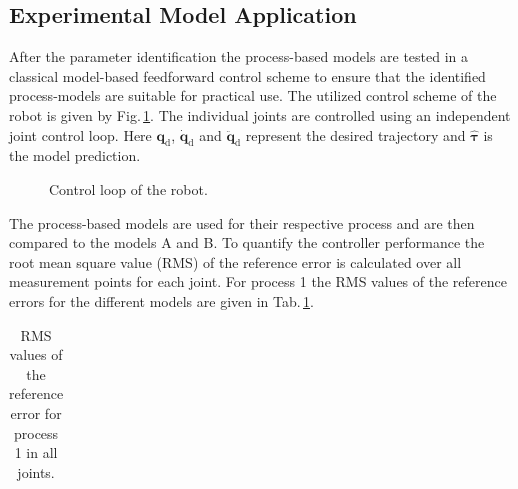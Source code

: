 
\subsection{Experimental Model Application}


After the parameter identification the process-based models are tested in a classical model-based feedforward control scheme to ensure that the identified process-models are suitable for practical use. The utilized control scheme of the robot is given by Fig.\,\ref{fig:controler}. The individual joints are controlled using an independent joint control loop. 
Here $\boldsymbol{q}_\text{d}$, $\dot{\boldsymbol{q}}_\text{d}$ and $\ddot{\boldsymbol{q}}_\text{d}$ represent the desired trajectory and $\hat{\boldsymbol{\tau}}$ is the model prediction.


\begin{figure}[tb]
  \vspace{-0.2cm}
  \centering
   
  \caption{Control loop of the robot.}
  \label{fig:controler}
  \vspace{-0.1cm}
\end{figure}


The process-based models are used for their respective process and are then compared to the models A and B. %
To quantify the controller performance the root mean square value (RMS) of the reference error is calculated over all measurement points for each joint. For process 1 the RMS values of the reference errors for the different models are given in Tab.\,\ref{tab:RefErrorProcess1}.%

\begin{table}[tb]
	\caption{RMS values of the reference error for process 1 in all joints.}\label{tab:RefErrorProcess1}
	\centering
	\begin{tabular}[h]{|r|c|c|c|c|}\hline
		
	\end{tabular}
\end{table}



